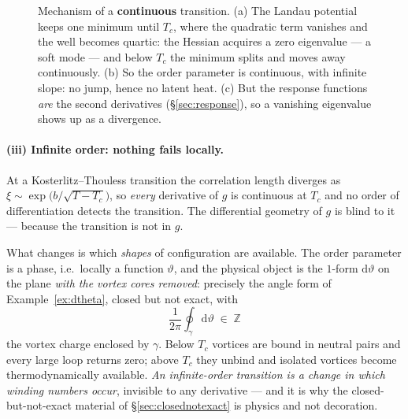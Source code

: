 \documentclass[10pt,a4paper]{article}
\newcommand{\dd}{\mathrm{d}}
\newcommand{\Z}{\mathbb{Z}}
\theoremstyle{plain}
\theoremstyle{definition}
\numberwithin{equation}{section}
\begin{document}
\begin{figure}[h]
\caption{Mechanism of a \textbf{continuous} transition. (a) The Landau
potential keeps one minimum until $T_c$, where the quadratic term vanishes and the well becomes
quartic: the Hessian acquires a zero eigenvalue --- a soft mode --- and below $T_c$ the minimum
splits and moves away continuously. (b) So the order parameter is continuous, with infinite
slope: no jump, hence no latent heat. (c) But the response functions \emph{are} the second
derivatives (\S\ref{sec:response}), so a vanishing eigenvalue shows up as a divergence.}
\label{fig:continuous}
\end{figure}

\paragraph{(iii) Infinite order: nothing fails locally.} At a Kosterlitz--Thouless transition
the correlation length diverges as $\xi\sim\exp\big(b/\sqrt{T-T_c}\big)$, so \emph{every}
derivative of $g$ is continuous at $T_c$ and no order of differentiation detects the transition.
The differential geometry of $g$ is blind to it --- because the transition is not in $g$.

What changes is which \emph{shapes} of configuration are available. The order parameter is a
phase, i.e.\ locally a function $\vartheta$, and the physical object is the $1$-form
$\dd\vartheta$ on the plane \emph{with the vortex cores removed}: precisely the angle form of
Example~\ref{ex:dtheta}, closed but not exact, with
\begin{equation}
\frac1{2\pi}\oint_\gamma\dd\vartheta\;\in\;\Z
\end{equation}
the vortex charge enclosed by $\gamma$. Below $T_c$ vortices are bound in neutral pairs and
every large loop returns zero; above $T_c$ they unbind and isolated vortices become
thermodynamically available. \emph{An infinite-order transition is a change in which winding
numbers occur}, invisible to any derivative --- and it is why the closed-but-not-exact material
of \S\ref{sec:closednotexact} is physics and not decoration.
\end{document}
